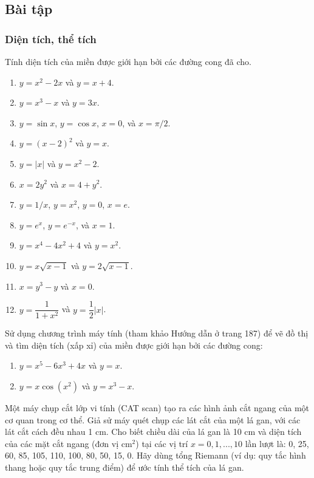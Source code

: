 \subsection{Bài tập}
\subsubsection{Diện tích, thể tích}

\begin{exercise}
    Tính diện tích của miền được giới hạn bởi các đường cong đã cho.
    \begin{enumerate}[label=(\alph*)]
        \item $y = x^2 - 2x$ và $y = x+4$.
        \item $y = x^3 - x$ và $y = 3x$.
        \item $y = \sin x$, $y = \cos x$, $x=0$, và $x=\pi/2$.
        \item $y = (x-2)^2$ và $y=x$.
        \item $y = |x|$ và $y = x^2 - 2$.
        \item $x = 2y^2$ và $x = 4+y^2$.
        \item $y = 1/x$, $y=x^2$, $y=0$, $x=e$.
        \item $y = e^x$, $y=e^{-x}$, và $x=1$.
        \item $y = x^4 - 4x^2 + 4$ và $y=x^2$.
        \item $y=x\sqrt{x-1}$ và $y=2\sqrt{x-1}$.
        \item $x=y^3-y$ và $x=0$.
        \item $y = \dfrac{1}{1+x^2}$ và $y = \dfrac{1}{2}|x|$.
    \end{enumerate}
\end{exercise}

\begin{exercise}
    Sử dụng chương trình máy tính (tham khảo Hướng dẫn ở trang 187) để vẽ đồ thị và tìm diện tích (xấp xỉ) của miền được giới hạn bởi các đường cong:
    \begin{enumerate}[label=(\alph*)]
        \item $y = x^5 - 6x^3 + 4x$ và $y=x$.
        \item $y = x \cos(x^2)$ và $y = x^3 - x$.
    \end{enumerate}
\end{exercise}

\begin{exercise}
    Một máy chụp cắt lớp vi tính (CAT scan) tạo ra các hình ảnh cắt ngang của một cơ quan trong cơ thể. Giả sử máy quét chụp các lát cắt của một lá gan, với các lát cắt cách đều nhau 1 cm. Cho biết chiều dài của lá gan là 10 cm và diện tích của các mặt cắt ngang (đơn vị cm$^2$) tại các vị trí $x=0, 1, ..., 10$ lần lượt là: 0, 25, 60, 85, 105, 110, 100, 80, 50, 15, 0. Hãy dùng tổng Riemann (ví dụ: quy tắc hình thang hoặc quy tắc trung điểm) để ước tính thể tích của lá gan.
\end{exercise}

